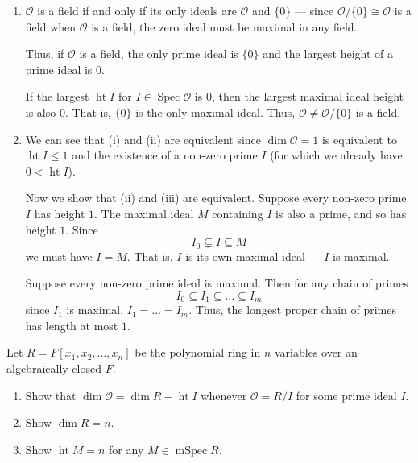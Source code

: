 \documentclass[12 pt, letterpaper]{hmcpset}
\begin{document}
\begin{solution}
	\begin{enumerate}
		\item $\mathcal{O}$ is a field if and only if its only ideals are $\mathcal{O}$ and $\{ 0 \}$ --- since $\mathcal{O} / \{ 0 \} \cong \mathcal{O}$ is a field when $\mathcal{O}$ is a field, the zero ideal must be maximal in any field.

			Thus, if $\mathcal{O}$ is a field, the only prime ideal is $\{ 0 \}$ and the largest height of a prime ideal is $0$.

			If the largest $\operatorname{ht} I$ for  $I \in \operatorname{Spec} \mathcal{O}$ is $0$, then the largest maximal ideal height is also $0$. That is, $\{ 0 \}$ is the only maximal ideal. Thus, $\mathcal{O} \neq \mathcal{O} / \{ 0 \}$ is a field.
		\item We can see that (i) and (ii) are equivalent since $\dim \mathcal{O} = 1$ is equivalent to $\operatorname{ht} I \le 1$ and the existence of a non-zero prime $I$ (for which we already have $0 < \operatorname{ht} I$).

			Now we show that (ii) and (iii) are equivalent. Suppose every non-zero prime $I$ has height $1$. The maximal ideal $M$ containing $I$ is also a prime, and so has height $1$. Since
			\[
				I_{0} \subsetneq I \subseteq M
			\]
			we must have $I = M$. That is, $I$ is its own maximal ideal --- $I$ is maximal.

			Suppose every non-zero prime ideal is maximal. Then for any chain of primes
			\[
				I_{0} \subseteq I_{1} \subseteq \dots \subseteq I_{m}
			\]
			since $I_{1}$ is maximal, $I_{1} = \dots = I_{m}$. Thus, the longest proper chain of primes has length at most $1$.
	\end{enumerate}
\end{solution}

\pagebreak

\begin{problem}[Problem 4.]
	Let $R = F[x_{1}, x_{2}, \dots, x_{n}]$ be the polynomial ring in $n$ variables over an algebraically closed $F$.
	\begin{enumerate}
		\item Show that $\dim \mathcal{O} = \dim R - \operatorname{ht} I$ whenever $\mathcal{O} = R / I$ for some prime ideal $I$.
		\item Show $\dim R = n$.
		\item Show $\operatorname{ht} M = n$ for any $M \in \operatorname{mSpec} R$.
	\end{enumerate}
\end{problem}
\end{document}
